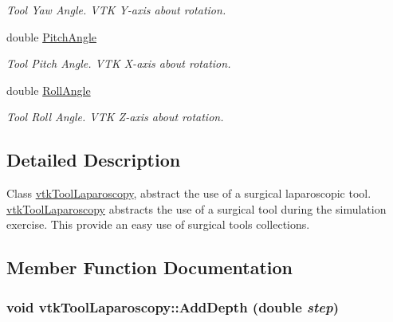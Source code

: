 \begin{DoxyCompactItemize}
\begin{DoxyCompactList}\small\item\em Tool Yaw Angle. VTK Y-\/axis about rotation. \item\end{DoxyCompactList}\item 
\hypertarget{classvtkToolLaparoscopy_a593986f2b9190a63743228e3b1eae783}{
double \hyperlink{classvtkToolLaparoscopy_a593986f2b9190a63743228e3b1eae783}{PitchAngle}}
\label{classvtkToolLaparoscopy_a593986f2b9190a63743228e3b1eae783}

\begin{DoxyCompactList}\small\item\em Tool Pitch Angle. VTK X-\/axis about rotation. \item\end{DoxyCompactList}\item 
\hypertarget{classvtkToolLaparoscopy_ad1eacfda1e68c134e282ef6d294e4e7d}{
double \hyperlink{classvtkToolLaparoscopy_ad1eacfda1e68c134e282ef6d294e4e7d}{RollAngle}}
\label{classvtkToolLaparoscopy_ad1eacfda1e68c134e282ef6d294e4e7d}

\begin{DoxyCompactList}\small\item\em Tool Roll Angle. VTK Z-\/axis about rotation. \item\end{DoxyCompactList}\end{DoxyCompactItemize}


\subsection{Detailed Description}
Class \hyperlink{classvtkToolLaparoscopy}{vtkToolLaparoscopy}, abstract the use of a surgical laparoscopic tool. \hyperlink{classvtkToolLaparoscopy}{vtkToolLaparoscopy} abstracts the use of a surgical tool during the simulation exercise. This provide an easy use of surgical tools collections. 

\subsection{Member Function Documentation}
\hypertarget{classvtkToolLaparoscopy_ac83d3abfa96db6faff943e22dac2ffe3}{
\subsubsection[{AddDepth}]{\setlength{\rightskip}{0pt plus 5cm}void vtkToolLaparoscopy::AddDepth (double {\em step})}}
\label{classvtkToolLaparoscopy_ac83d3abfa96db6faff943e22dac2ffe3}


